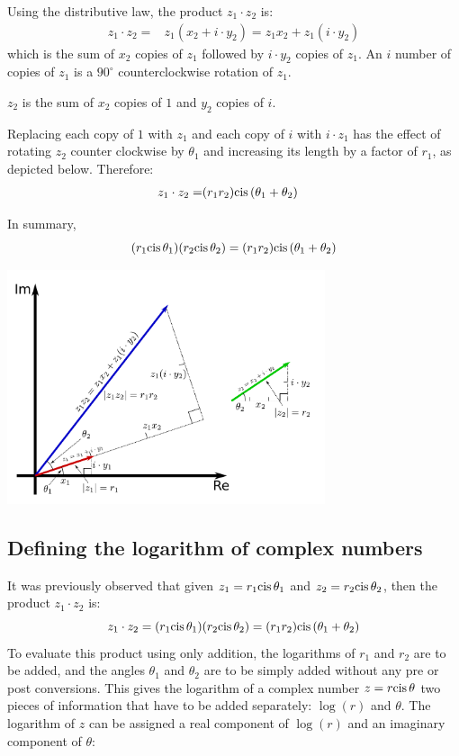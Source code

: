\documentclass{article}
\newcommand{\cis}{\textnormal{cis}\,}
\begin{document}
Using the distributive law, the product \(z_1 \cdot z_2\) is:
\begin{align*}
z_1 \cdot z_2 
= & z_1 (x_2 + i \cdot y_2) 
= z_1 x_2 + z_1 (i \cdot y_2)
\end{align*}
which is the sum of \(x_2\) copies of \(z_1\) followed by \(i \cdot y_2\) copies of \(z_1\). An \(i\) number of copies of \(z_1\) is a \(90^\circ\) counterclockwise rotation of \(z_1\). 

\(z_2\) is the sum of \(x_2\) copies of \(1\) and \(y_2\) copies of \(i\). 

Replacing each copy of \(1\) with \(z_1\) and each copy of \(i\) with \(i \cdot z_1\) has the effect of rotating \(z_2\) counter clockwise by \(\theta_1\) and increasing its length by a factor of \(r_1\), as depicted below. Therefore:
\begin{align*}
z_1 \cdot z_2 = & (r_1 r_2) \cis(\theta_1 + \theta_2)
\end{align*}

In summary, 
\[(r_1 \cis\theta_1)(r_2\cis\theta_2) = (r_1 r_2) \cis(\theta_1 + \theta_2)\]

\begin{center}
\includegraphics[width = 0.7\textwidth]{complex_number_multiplication}
\end{center}



\subsection*{Defining the logarithm of complex numbers}

It was previously observed that given \(z_1 = r_1 \cis\theta_1\) and \(z_2 = r_2\cis\theta_2\), then the product \(z_1 \cdot z_2\) is: 
\[z_1 \cdot z_2 = (r_1 \cis\theta_1)(r_2\cis\theta_2) = (r_1 r_2) \cis(\theta_1 + \theta_2)\]
To evaluate this product using only addition, the logarithms of \(r_1\) and \(r_2\) are to be added, and the angles \(\theta_1\) and \(\theta_2\) are to be simply added without any pre or post conversions. This gives the logarithm of a complex number \(z = r \cis\theta\) two pieces of information that have to be added separately: \(\log(r)\) and \(\theta\). The logarithm of \(z\) can be assigned a real component of \(\log(r)\) and an imaginary component of \(\theta\):
\end{document}

